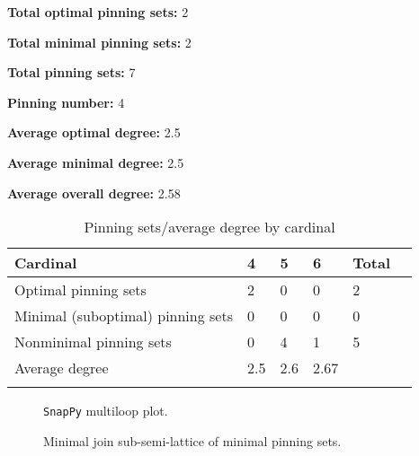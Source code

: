 \documentclass{article}%
\begin{document}
\begin{multicols}{2}
{\normalsize \noindent\textbf{Total optimal pinning sets:} 2

\noindent\textbf{Total minimal pinning sets:} 2

\noindent\textbf{Total pinning sets:} 7

\noindent\textbf{Pinning number:} 4

}
\columnbreak

{\normalsize \noindent\textbf{Average optimal degree:} 2.5

\noindent\textbf{Average minimal degree:} 2.5

\noindent\textbf{Average overall degree:} 2.58

}
\end{multicols}

\begin{table}[ht]
	\caption{Pinning sets/average degree by cardinal}
	\centering
	\renewcommand{\arraystretch}{1.5}
	\begin{tabularx}{\textwidth}{lXXXXX}
		\toprule
			Cardinal & 4 & 5 & 6 & Total\\
			\hline
			Optimal pinning sets & 2 & 0 & 0 & 2 \\
			Minimal (suboptimal) pinning sets & 0 & 0 & 0 & 0 \\
			Nonminimal pinning sets & 0 & 4 & 1 & 5 \\
			Average degree & 2.5 & 2.6 & 2.67 &  \\
		\bottomrule \\ 
	\end{tabularx}
\end{table}

\begin{multicols}{2}
\begin{figure}[H]
\centering

\caption{\texttt{SnapPy} multiloop plot.}
\label{fig:tex/img/[[8, 3, 1, 4], [4, 7, 5, 8], [5, 2, 6, 3], [1, 6, 2, 7]].svg}
\end{figure}
\columnbreak

\begin{figure}[H]
\centering
\scalebox{0.8}{}
\caption{Minimal join sub-semi-lattice of minimal pinning sets.}
\label{fig:tex/img/[[8, 3, 1, 4], [4, 7, 5, 8], [5, 2, 6, 3], [1, 6, 2, 7]].pgf}
\end{figure}
\end{multicols}
\end{document}
